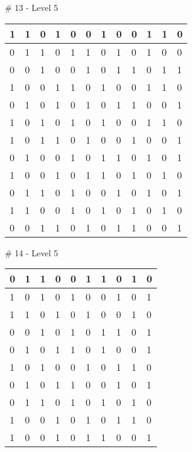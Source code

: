 \# 13 - Level 5 \newline
\begin{tabular}{|m{\collen}|m{\collen}|m{\collen}|m{\collen}|m{\collen}|m{\collen}|m{\collen}|m{\collen}|m{\collen}|m{\collen}|m{\collen}|m{\collen}|}
\hline
  1 & 1 & 0 & 1 & 0 & 0 & 1 & 0 & 0 & 1 & 1 & 0 \\
\hline
  0 & 1 & 1 & 0 & 1 & 1 & 0 & 1 & 0 & 1 & 0 & 0 \\
\hline
  0 & 0 & 1 & 0 & 0 & 1 & 0 & 1 & 1 & 0 & 1 & 1 \\
\hline
  1 & 0 & 0 & 1 & 1 & 0 & 1 & 0 & 0 & 1 & 1 & 0 \\
\hline
  0 & 1 & 0 & 1 & 0 & 1 & 0 & 1 & 1 & 0 & 0 & 1 \\
\hline
  1 & 0 & 1 & 0 & 1 & 0 & 1 & 0 & 0 & 1 & 1 & 0 \\
\hline
  1 & 0 & 1 & 1 & 0 & 1 & 0 & 0 & 1 & 0 & 0 & 1 \\
\hline
  0 & 1 & 0 & 0 & 1 & 0 & 1 & 1 & 0 & 1 & 0 & 1 \\
\hline
  1 & 0 & 0 & 1 & 0 & 1 & 1 & 0 & 1 & 0 & 1 & 0 \\
\hline
  0 & 1 & 1 & 0 & 1 & 0 & 0 & 1 & 0 & 1 & 0 & 1 \\
\hline
  1 & 1 & 0 & 0 & 1 & 0 & 1 & 0 & 1 & 0 & 1 & 0 \\
\hline
  0 & 0 & 1 & 1 & 0 & 1 & 0 & 1 & 1 & 0 & 0 & 1 \\
\hline
\end{tabular}


\smallskip

\# 14 - Level 5 \newline
\begin{tabular}{|m{\collen}|m{\collen}|m{\collen}|m{\collen}|m{\collen}|m{\collen}|m{\collen}|m{\collen}|m{\collen}|m{\collen}|}
\hline
  0 & 1 & 1 & 0 & 0 & 1 & 1 & 0 & 1 & 0 \\
\hline
  1 & 0 & 1 & 0 & 1 & 0 & 0 & 1 & 0 & 1 \\
\hline
  1 & 1 & 0 & 1 & 0 & 1 & 0 & 0 & 1 & 0 \\
\hline
  0 & 0 & 1 & 0 & 1 & 0 & 1 & 1 & 0 & 1 \\
\hline
  0 & 1 & 0 & 1 & 1 & 0 & 1 & 0 & 0 & 1 \\
\hline
  1 & 0 & 1 & 0 & 0 & 1 & 0 & 1 & 1 & 0 \\
\hline
  0 & 1 & 0 & 1 & 1 & 0 & 0 & 1 & 0 & 1 \\
\hline
  0 & 1 & 1 & 0 & 1 & 0 & 1 & 0 & 1 & 0 \\
\hline
  1 & 0 & 0 & 1 & 0 & 1 & 0 & 1 & 1 & 0 \\
\hline
  1 & 0 & 0 & 1 & 0 & 1 & 1 & 0 & 0 & 1 \\
\hline
\end{tabular}


